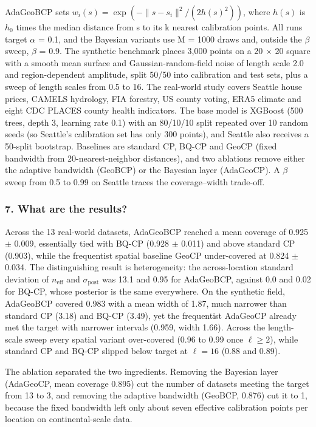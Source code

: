 \documentclass[11pt]{article}
\newcommand{\question}[1]{\subsubsection*{#1}}
\begin{document}
AdaGeoBCP sets $w_i(s) = \exp(-\|s - s_i\|^2/(2h(s)^2))$, where $h(s)$ is $h_{0}$ times the median distance from s to its k nearest calibration points. All runs target \ensuremath{\alpha} = 0.1, and the Bayesian variants use M = 1000 draws and, outside the \ensuremath{\beta} sweep, \ensuremath{\beta} = 0.9. The synthetic benchmark places 3,000 points on a 20 \ensuremath{\times} 20 square with a smooth mean surface and Gaussian-random-field noise of length scale 2.0 and region-dependent amplitude, split 50/50 into calibration and test sets, plus a sweep of length scales from 0.5 to 16. The real-world study covers Seattle house prices, CAMELS hydrology, FIA forestry, US county voting, ERA5 climate and eight CDC PLACES county health indicators. The base model is XGBoost (500 trees, depth 3, learning rate 0.1) with an 80/10/10 split repeated over 10 random seeds (so Seattle's calibration set has only 300 points), and Seattle also receives a 50-split bootstrap. Baselines are standard CP, BQ-CP and GeoCP (fixed bandwidth from 20-nearest-neighbor distances), and two ablations remove either the adaptive bandwidth (GeoBCP) or the Bayesian layer (AdaGeoCP). A \ensuremath{\beta} sweep from 0.5 to 0.99 on Seattle traces the coverage--width trade-off.

\question{7. What are the results?}

Across the 13 real-world datasets, AdaGeoBCP reached a mean coverage of 0.925 \ensuremath{\pm} 0.009, essentially tied with BQ-CP (0.928 \ensuremath{\pm} 0.011) and above standard CP (0.903), while the frequentist spatial baseline GeoCP under-covered at 0.824 \ensuremath{\pm} 0.034. The distinguishing result is heterogeneity: the across-location standard deviation of $n_{\mathrm{eff}}$ and $\sigma_{\mathrm{post}}$ was 13.1 and 0.95 for AdaGeoBCP, against 0.0 and 0.02 for BQ-CP, whose posterior is the same everywhere. On the synthetic field, AdaGeoBCP covered 0.983 with a mean width of 1.87, much narrower than standard CP (3.18) and BQ-CP (3.49), yet the frequentist AdaGeoCP already met the target with narrower intervals (0.959, width 1.66). Across the length-scale sweep every spatial variant over-covered (0.96 to 0.99 once $\ell \geq 2$), while standard CP and BQ-CP slipped below target at $\ell = 16$ (0.88 and 0.89).

The ablation separated the two ingredients. Removing the Bayesian layer (AdaGeoCP, mean coverage 0.895) cut the number of datasets meeting the target from 13 to 3, and removing the adaptive bandwidth (GeoBCP, 0.876) cut it to 1, because the fixed bandwidth left only about seven effective calibration points per location on continental-scale data.
\end{document}
